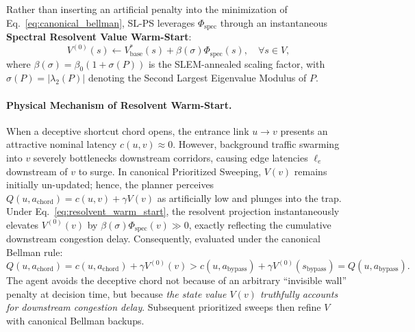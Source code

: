 \documentclass[11pt,a4paper]{article}
\begin{document}
Rather than inserting an artificial penalty into the minimization of Eq.~\eqref{eq:canonical_bellman}, SL-PS leverages $\Phi_{\text{spec}}$ through an instantaneous \textbf{Spectral Resolvent Value Warm-Start}:
\begin{equation}
\label{eq:resolvent_warm_start}
V^{(0)}(s) \leftarrow V_{\text{base}}^*(s) + \beta(\sigma) \Phi_{\text{spec}}(s), \quad \forall s \in V,
\end{equation}
where $\beta(\sigma) = \beta_0 (1 + \sigma(P))$ is the SLEM-annealed scaling factor, with $\sigma(P) = |\lambda_2(P)|$ denoting the Second Largest Eigenvalue Modulus of $P$.

\paragraph{Physical Mechanism of Resolvent Warm-Start.}
When a deceptive shortcut chord opens, the entrance link $u \to v$ presents an attractive nominal latency $c(u, v) \approx 0$. However, background traffic swarming into $v$ severely bottlenecks downstream corridors, causing edge latencies $\ell_e$ downstream of $v$ to surge. In canonical Prioritized Sweeping, $V(v)$ remains initially un-updated; hence, the planner perceives $Q(u, a_{\text{chord}}) = c(u, v) + \gamma V(v)$ as artificially low and plunges into the trap.
Under Eq.~\eqref{eq:resolvent_warm_start}, the resolvent projection instantaneously elevates $V^{(0)}(v)$ by $\beta(\sigma) \Phi_{\text{spec}}(v) \gg 0$, exactly reflecting the cumulative downstream congestion delay. Consequently, evaluated under the canonical Bellman rule:
\begin{equation}
Q(u, a_{\text{chord}}) = c(u, a_{\text{chord}}) + \gamma V^{(0)}(v) > c(u, a_{\text{bypass}}) + \gamma V^{(0)}(s_{\text{bypass}}) = Q(u, a_{\text{bypass}}).
\end{equation}
The agent avoids the deceptive chord not because of an arbitrary ``invisible wall'' penalty at decision time, but because \textit{the state value $V(v)$ truthfully accounts for downstream congestion delay}. Subsequent prioritized sweeps then refine $V$ with canonical Bellman backups.
\end{document}

